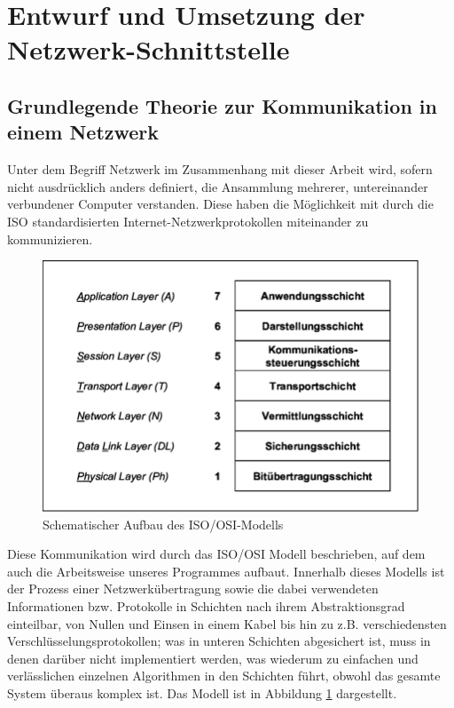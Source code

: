 
%
\section{Entwurf und Umsetzung der Netzwerk-Schnittstelle}
\subsection{Grundlegende Theorie zur Kommunikation in einem Netzwerk}
Unter dem Begriff Netzwerk im Zusammenhang mit dieser Arbeit wird, sofern nicht ausdrücklich anders definiert, die Ansammlung mehrerer, untereinander verbundener Computer verstanden.
Diese haben die Möglichkeit mit durch die ISO standardisierten Internet-Netzwerkprotokollen miteinander zu kommunizieren.\\ 

\begin{figure}
\includegraphics[scale=1]{isoosi}
\caption{Schematischer Aufbau des ISO/OSI-Modells\protect\footnotemark}
\label{ISOOSI}
\end{figure}

Diese Kommunikation wird durch das ISO/OSI Modell beschrieben, auf dem auch die Arbeitsweise unseres Programmes aufbaut.
Innerhalb dieses Modells ist der Prozess einer Netzwerkübertragung sowie die dabei verwendeten Informationen bzw. Protokolle in Schichten nach ihrem Abstraktionsgrad einteilbar, von Nullen und Einsen in einem Kabel bis hin zu z.B. verschiedensten Verschlüsselungsprotokollen; was in unteren Schichten abgesichert ist, muss in denen darüber nicht implementiert werden, was wiederum zu einfachen und verlässlichen einzelnen Algorithmen in den Schichten führt, obwohl das gesamte System überaus komplex ist. 
Das Modell ist in Abbildung \ref{ISOOSI} dargestellt.

